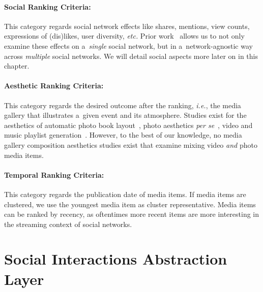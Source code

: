 \paragraph{Social Ranking Criteria:}

This category regards social network effects like shares, mentions,
view counts, expressions of (dis)likes, user diversity, \emph{etc.}
Prior work~\cite{khrouf2012aggregatingsocialmedia}
allows us to not only examine these effects
on a~\emph{single} social network,
but in a~network-agnostic way across \emph{multiple} social networks.
We will detail social aspects more later on in this chapter.

\paragraph{Aesthetic Ranking Criteria:}

This category regards the desired outcome after the ranking, \emph{i.e.},
the media gallery that illustrates a~given event and its atmosphere.
Studies exist for the aesthetics of
automatic photo book layout~\cite{sandhaus2011photobook},
photo aesthetics \emph{per se}~\cite{obrador2012photoaesthetics},
video and music playlist generation~\cite{knees2006musicplaylist,davidson2010videorecommendation}.
However, to the best of our knowledge,
no media gallery composition aesthetics studies exist
that examine mixing video \emph{and} photo media items.

\paragraph{Temporal Ranking Criteria:}

This category regards the publication date of media items.
If media items are clustered, we use the youngest media item
as cluster representative.
Media items can be ranked by recency, as oftentimes more recent items
are more interesting in the streaming context of social networks.

\section{Social Interactions Abstraction Layer}
\label{sec:social-interactions-abstraction-layer}

